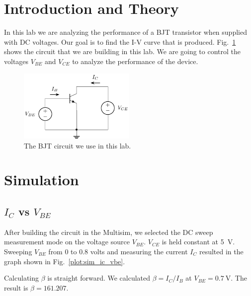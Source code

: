 \documentclass{../../ece-report}
\begin{document}
\maketitle

\section{Introduction and Theory}

In this lab we are analyzing the performance of a BJT
transistor when supplied with DC voltages. Our goal
is to find the I-V curve that is produced. Fig.~\ref{fig:circuit}
shows the circuit that we are building in this lab.
We are going to control the voltages $V_{BE}$ and $V_{CE}$
to analyze the performance of the device.

\begin{figure}[h!]
  \centering
  \includegraphics[width=0.5\textwidth]{../circuits/circuit.pdf}
  \caption{The BJT circuit we use in this lab.}
  \label{fig:circuit}
\end{figure}

\section{Simulation}

\subsection*{$I_C$ vs $V_{BE}$}

After building the circuit in the Multisim, we selected
the DC sweep measurement mode on the voltage source
$V_{BE}$. $V_{CE}$ is held constant at 5~V. Sweeping
$V_{BE}$ from 0 to 0.8 volts and measuring the current
$I_C$ resulted in the graph shown in Fig.~\ref{plot:sim_ic_vbe}.


Calculating $\beta$ is straight forward. We calculated $\beta = I_C / I_B$ at 
$V_{BE} = 0.7~\si{\V}$. The result is $\beta = 161.207$.
\end{document}
